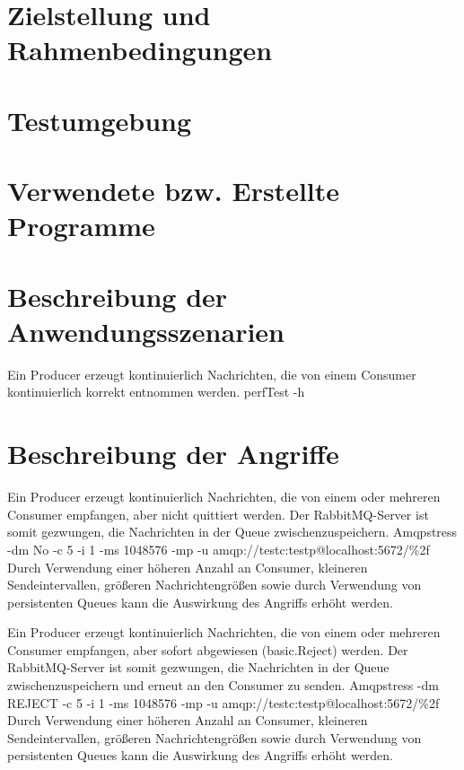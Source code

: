 \documentclass[	a4paper,
			11pt,
			titlepage,
			oneside,
			fleqn,
			listof=totoc,
			parskip,
			chapterprefix=false,
			numbers=noenddot]{scrreprt}
\begin{document}
	
	
	\section*{Zielstellung und Rahmenbedingungen}

	
	\clearpage
	\section*{Testumgebung}
	
	
	\clearpage
	\section*{Verwendete bzw. Erstellte Programme}
	
	\clearpage
	\section*{Beschreibung der Anwendungsszenarien}
		{Ein Producer erzeugt kontinuierlich Nachrichten, die von einem Consumer kontinuierlich korrekt entnommen werden.}%
		{perfTest -h}%
		{}
		
	\usecase{}%
		{}%
		{}%
		{}
		
	\usecase{}%
		{}%
		{}%
		{}
	
	\clearpage
	\section*{Beschreibung der Angriffe}
		{Ein Producer erzeugt kontinuierlich Nachrichten, die von einem oder mehreren Consumer empfangen, aber nicht quittiert werden.%
		 Der RabbitMQ-Server ist somit gezwungen, die Nachrichten in der Queue zwischenzuspeichern.}%
		{}%
		{Amqpstress -dm No -c 5 -i 1 -ms 1048576 -mp -u amqp://testc:testp@localhost:5672/\%2f}%
		{}%
		{Durch Verwendung einer höheren Anzahl an Consumer, kleineren Sendeintervallen, größeren Nachrichtengrößen sowie durch Verwendung von persistenten %
		Queues kann die Auswirkung des Angriffs erhöht werden.}
	
		{Ein Producer erzeugt kontinuierlich Nachrichten, die von einem oder mehreren Consumer empfangen, aber sofort abgewiesen (basic.Reject) werden.%
		 Der RabbitMQ-Server ist somit gezwungen, die Nachrichten in der Queue zwischenzuspeichern und erneut an den Consumer zu senden.}%
		{}%
		{Amqpstress -dm REJECT -c 5 -i 1 -ms 1048576 -mp -u amqp://testc:testp@localhost:5672/\%2f}%
		{}%
		{Durch Verwendung einer höheren Anzahl an Consumer, kleineren Sendeintervallen, größeren Nachrichtengrößen sowie durch Verwendung von persistenten %
		Queues kann die Auswirkung des Angriffs erhöht werden.}
	
\end{document}
